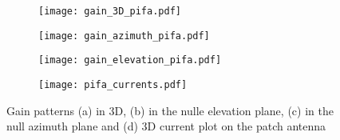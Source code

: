 \documentclass[12pt,a4paper]{article}
\begin{document}
{\begin{figure}[h]
	\begin{center}
		\begin{subfigure}{0.5\linewidth}
			\texttt{[image: gain\_3D\_pifa.pdf]}
			\caption{}
		\end{subfigure}
		\begin{subfigure}{0.5\linewidth}
			\texttt{[image: gain\_azimuth\_pifa.pdf]}
		\caption{}	\end{subfigure}
		\begin{subfigure}{0.5\linewidth}
		\texttt{[image: gain\_elevation\_pifa.pdf]}
	\caption{}	\end{subfigure}
	\begin{subfigure}{0.5\linewidth}
	\texttt{[image: pifa\_currents.pdf]}
	\caption{} \end{subfigure}
		\caption{\selectfont
			\color{gray}
		Gain patterns (a) in 3D, (b) in the nulle elevation plane, (c) in the null azimuth plane and (d) 3D current plot on the patch antenna }
	\end{center}  
\end{figure}

}
\end{document}
